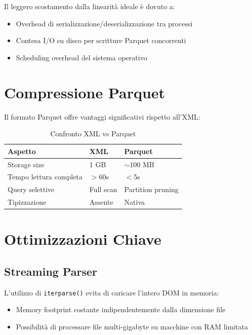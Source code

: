 \begin{infobox}
Il leggero scostamento dalla linearità ideale è dovuto a:
\begin{itemize}
    \item Overhead di serializzazione/deserializzazione tra processi
    \item Contesa I/O su disco per scritture Parquet concorrenti
    \item Scheduling overhead del sistema operativo
\end{itemize}
\end{infobox}

\section{Compressione Parquet}

Il formato Parquet offre vantaggi significativi rispetto all'XML:

\begin{table}[h]
\centering
\begin{tabular}{@{}lll@{}}
\toprule
\textbf{Aspetto} & \textbf{XML} & \textbf{Parquet} \\
\midrule
Storage size & 1 GB & $\sim$100 MB \\
Tempo lettura completa & $>$60s & $<$5s \\
Query selettive & Full scan & Partition pruning \\
Tipizzazione & Assente & Nativa \\
\bottomrule
\end{tabular}
\caption{Confronto XML vs Parquet}
\end{table}

\section{Ottimizzazioni Chiave}

\subsection{Streaming Parser}

L'utilizzo di \texttt{iterparse()} evita di caricare l'intero DOM in memoria:

\begin{itemize}
    \item Memory footprint costante indipendentemente dalla dimensione file
    \item Possibilità di processare file multi-gigabyte su macchine con RAM limitata
\end{itemize}

